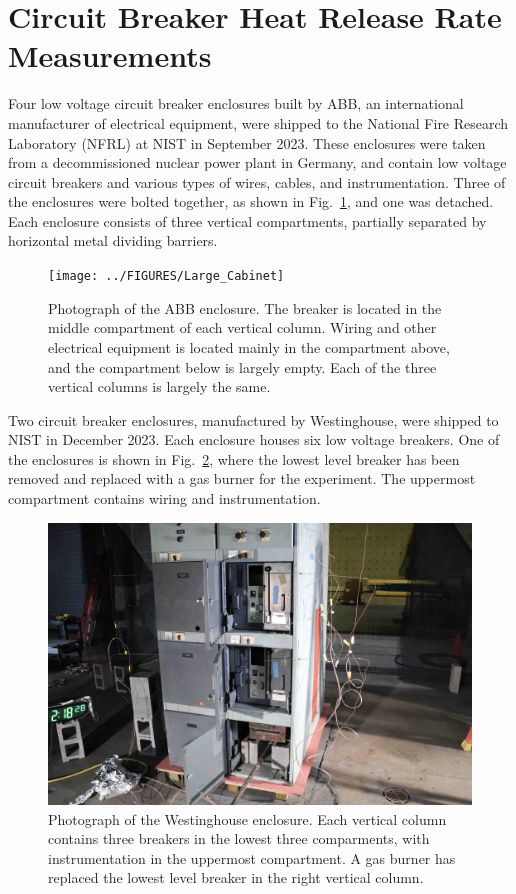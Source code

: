 \clearpage

\section{Circuit Breaker Heat Release Rate Measurements}
\label{Sec:Circuit Breakers}

Four low voltage circuit breaker enclosures built by ABB, an international manufacturer of electrical equipment, were shipped to the National Fire Research Laboratory (NFRL) at NIST in September 2023. These enclosures were taken from a decommissioned nuclear power plant in Germany, and contain low voltage circuit breakers and various types of wires, cables, and instrumentation. Three of the enclosures were bolted together, as shown in Fig.~\ref{fig:Cabinet_1}, and one was detached. Each enclosure consists of three vertical compartments, partially separated by horizontal metal dividing barriers.

\begin{figure}[ht]
\centering
\texttt{[image: ../FIGURES/Large\_Cabinet]}
\caption[Photograph of ABB enclosure] {Photograph of the ABB enclosure. The breaker is located in the middle compartment of each vertical column. Wiring and other electrical equipment is located mainly in the compartment above, and the compartment below is largely empty. Each of the three vertical columns is largely the same.}
\label{fig:Cabinet_1}
\end{figure}

Two circuit breaker enclosures, manufactured by Westinghouse, were shipped to NIST in December 2023. Each enclosure houses six low voltage breakers. One of the enclosures is shown in Fig.~\ref{fig:Cabinet_2}, where the lowest level breaker has been removed and replaced with a gas burner for the experiment. The uppermost compartment contains wiring and instrumentation.

\begin{figure}[ht]
\centering
\includegraphics[width=6.5in]{../FIGURES/Westinghouse}
\caption[Photograph of Westinghouse enclosure] {Photograph of the Westinghouse enclosure. Each vertical column contains three breakers in the lowest three comparments, with instrumentation in the uppermost compartment. A gas burner has replaced the lowest level breaker in the right vertical column.}
\label{fig:Cabinet_2}
\end{figure}

